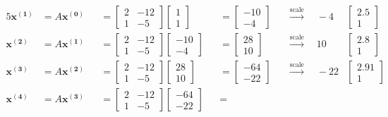 \documentclass[12pt]{article}
\begin{document}
\begin{alignat*}{5}
\mathbf{x^{(1)}} &= A\mathbf{x^{(0)}} &&=
\begin{bmatrix} 2 & -12 \\ 1 & -5 \end{bmatrix}\begin{bmatrix} 1 \\ 1 \end{bmatrix} &&=
\begin{bmatrix} -10 \\ -4 \end{bmatrix} &&\xrightarrow{\text{scale}}\quad
-4&\begin{bmatrix} 2.5 \\ 1 \end{bmatrix}
\\
\mathbf{x^{(2)}} &= A\mathbf{x^{(1)}} &&=
\begin{bmatrix} 2 & -12 \\ 1 & -5 \end{bmatrix}\begin{bmatrix} -10 \\ -4 \end{bmatrix} &&=
\begin{bmatrix} 28 \\ 10 \end{bmatrix} &&\xrightarrow{\text{scale}}\quad
10&\begin{bmatrix} 2.8 \\ 1 \end{bmatrix}
\\
\mathbf{x^{(3)}} &= A\mathbf{x^{(2)}} &&=
\begin{bmatrix} 2 & -12 \\ 1 & -5 \end{bmatrix}\begin{bmatrix} 28 \\ 10 \end{bmatrix} &&=
\begin{bmatrix} -64 \\ -22 \end{bmatrix} &&\xrightarrow{\text{scale}}\quad
-22&\begin{bmatrix} 2.91 \\ 1 \end{bmatrix}
\\
\mathbf{x^{(4)}} &= A\mathbf{x^{(3)}} &&= 
\begin{bmatrix} 2 & -12 \\ 1 & -5 \end{bmatrix}\begin{bmatrix} -64 \\ -22 \end{bmatrix} &&=

\end{alignat*}
\end{document}
